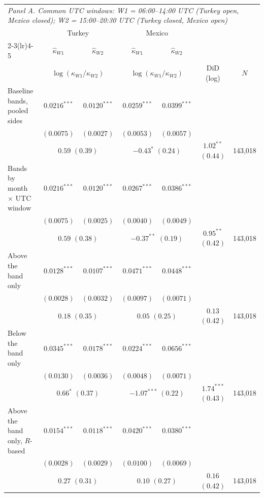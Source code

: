\begin{tabular}{lcccccc}
\toprule
\multicolumn{7}{l}{\emph{Panel A. Common UTC windows: W1 = 06:00--14:00 UTC (Turkey open, Mexico closed); W2 = 15:00--20:30 UTC (Turkey closed, Mexico open)}} \\
 & \multicolumn{2}{c}{Turkey} & \multicolumn{2}{c}{Mexico} & & \\
\cmidrule(lr){2-3}\cmidrule(lr){4-5}
 & $\hat\kappa_{W1}$ & $\hat\kappa_{W2}$ & $\hat\kappa_{W1}$ & $\hat\kappa_{W2}$ & & \\
 & \multicolumn{2}{c}{$\log(\kappa_{W1}/\kappa_{W2})$} & \multicolumn{2}{c}{$\log(\kappa_{W1}/\kappa_{W2})$} & DiD (log) & $N$ \\
\midrule
Baseline bands, pooled sides & $0.0216^{***}$ & $0.0120^{***}$ & $0.0259^{***}$ & $0.0399^{***}$ & & \\
 & $(0.0075)$ & $(0.0027)$ & $(0.0053)$ & $(0.0057)$ & & \\
 & \multicolumn{2}{c}{$0.59$ $(0.39)$} & \multicolumn{2}{c}{$-0.43^{*}$ $(0.24)$} & $1.02^{**}$ $(0.44)$ & 143,018 \\[2pt]
Bands by month $\times$ UTC window & $0.0216^{***}$ & $0.0120^{***}$ & $0.0267^{***}$ & $0.0386^{***}$ & & \\
 & $(0.0075)$ & $(0.0025)$ & $(0.0040)$ & $(0.0049)$ & & \\
 & \multicolumn{2}{c}{$0.59$ $(0.38)$} & \multicolumn{2}{c}{$-0.37^{**}$ $(0.19)$} & $0.95^{**}$ $(0.42)$ & 143,018 \\[2pt]
Above the band only & $0.0128^{***}$ & $0.0107^{***}$ & $0.0471^{***}$ & $0.0448^{***}$ & & \\
 & $(0.0028)$ & $(0.0032)$ & $(0.0097)$ & $(0.0071)$ & & \\
 & \multicolumn{2}{c}{$0.18$ $(0.35)$} & \multicolumn{2}{c}{$0.05$ $(0.25)$} & $0.13$ $(0.42)$ & 143,018 \\[2pt]
Below the band only & $0.0345^{***}$ & $0.0178^{***}$ & $0.0224^{***}$ & $0.0656^{***}$ & & \\
 & $(0.0130)$ & $(0.0036)$ & $(0.0048)$ & $(0.0071)$ & & \\
 & \multicolumn{2}{c}{$0.66^{*}$ $(0.37)$} & \multicolumn{2}{c}{$-1.07^{***}$ $(0.22)$} & $1.74^{***}$ $(0.43)$ & 143,018 \\[2pt]
Above the band only, $R$-based & $0.0154^{***}$ & $0.0118^{***}$ & $0.0420^{***}$ & $0.0380^{***}$ & & \\
 & $(0.0028)$ & $(0.0029)$ & $(0.0100)$ & $(0.0069)$ & & \\
 & \multicolumn{2}{c}{$0.27$ $(0.31)$} & \multicolumn{2}{c}{$0.10$ $(0.27)$} & $0.16$ $(0.42)$ & 143,018 \\[2pt]

\end{tabular}
